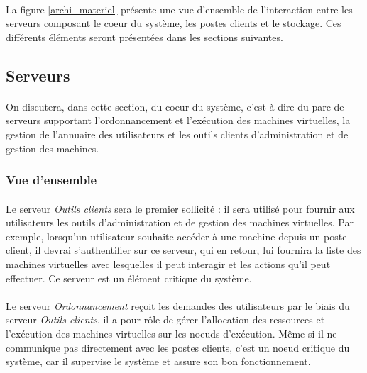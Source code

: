 \paragraph{} La figure \ref{archi_materiel} présente une vue d'ensemble de
l'interaction entre les serveurs composant le coeur du système, les postes
clients et le stockage. Ces différents éléments seront présentées dans les
sections suivantes.

\subsection{Serveurs}

\paragraph{} On discutera, dans cette section, du coeur du système, c'est à dire
du parc de serveurs supportant l'ordonnancement et l'exécution des machines
virtuelles, la gestion de l'annuaire des utilisateurs et les outils clients
d'administration et de gestion des machines.

\subsubsection{Vue d'ensemble}

\paragraph{} Le serveur \emph{Outils clients} sera le premier sollicité : il sera
utilisé pour fournir aux utilisateurs les outils d'administration et de gestion
des machines virtuelles. Par exemple, lorsqu'un utilisateur souhaite accéder à
une machine depuis un poste client, il devrai s'authentifier sur ce serveur, qui
en retour, lui fournira la liste des machines virtuelles avec lesquelles il peut
interagir et les actions qu'il peut effectuer. Ce serveur est un élément
critique du système.

\paragraph{} Le serveur \emph{Ordonnancement} reçoit les demandes des
utilisateurs par le biais du serveur \emph{Outils clients}, il a pour rôle de
gérer l'allocation des ressources et l'exécution des machines virtuelles sur les
noeuds d'exécution. Même si il ne communique pas directement avec les postes
clients, c'est un noeud critique du système, car il supervise le système et
assure son bon fonctionnement.


